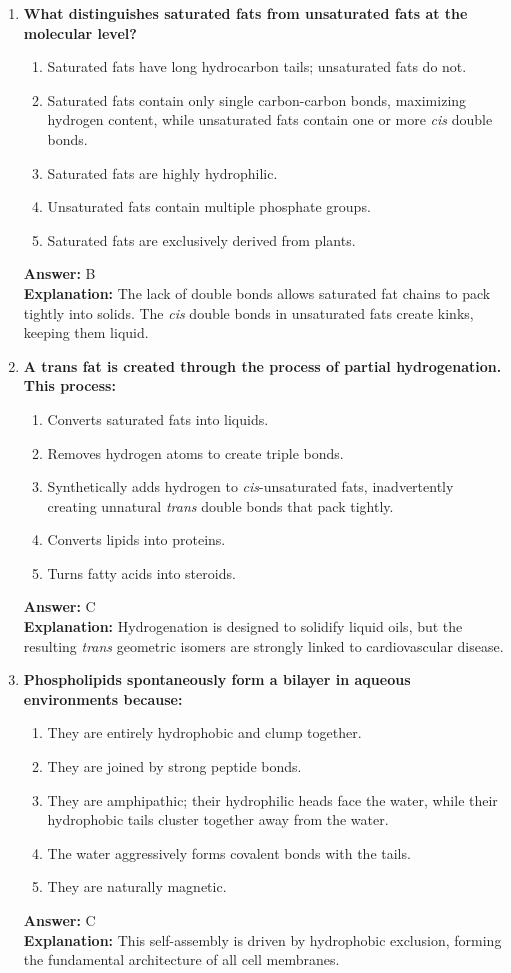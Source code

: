 \documentclass[11pt, a4paper]{article}
\begin{document}
\begin{enumerate}
\item \textbf{What distinguishes saturated fats from unsaturated fats at the molecular level?}
\begin{enumerate}[label=\Alph*.]
    \item Saturated fats have long hydrocarbon tails; unsaturated fats do not.
    \item Saturated fats contain only single carbon-carbon bonds, maximizing hydrogen content, while unsaturated fats contain one or more \textit{cis} double bonds.
    \item Saturated fats are highly hydrophilic.
    \item Unsaturated fats contain multiple phosphate groups.
    \item Saturated fats are exclusively derived from plants.
\end{enumerate}
\textbf{Answer:} B \\
\textbf{Explanation:} The lack of double bonds allows saturated fat chains to pack tightly into solids. The \textit{cis} double bonds in unsaturated fats create kinks, keeping them liquid.

\item \textbf{A trans fat is created through the process of partial hydrogenation. This process:}
\begin{enumerate}[label=\Alph*.]
    \item Converts saturated fats into liquids.
    \item Removes hydrogen atoms to create triple bonds.
    \item Synthetically adds hydrogen to \textit{cis}-unsaturated fats, inadvertently creating unnatural \textit{trans} double bonds that pack tightly.
    \item Converts lipids into proteins.
    \item Turns fatty acids into steroids.
\end{enumerate}
\textbf{Answer:} C \\
\textbf{Explanation:} Hydrogenation is designed to solidify liquid oils, but the resulting \textit{trans} geometric isomers are strongly linked to cardiovascular disease.

\item \textbf{Phospholipids spontaneously form a bilayer in aqueous environments because:}
\begin{enumerate}[label=\Alph*.]
    \item They are entirely hydrophobic and clump together.
    \item They are joined by strong peptide bonds.
    \item They are amphipathic; their hydrophilic heads face the water, while their hydrophobic tails cluster together away from the water.
    \item The water aggressively forms covalent bonds with the tails.
    \item They are naturally magnetic.
\end{enumerate}
\textbf{Answer:} C \\
\textbf{Explanation:} This self-assembly is driven by hydrophobic exclusion, forming the fundamental architecture of all cell membranes.


\end{enumerate}
\end{document}
